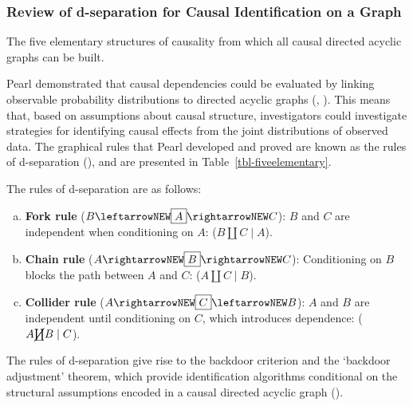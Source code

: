 \documentclass[
  single column]{article}
\begin{document}
\subsubsection{Review of d-separation for Causal Identification on a
Graph}\label{review-of-d-separation-for-causal-identification-on-a-graph}

\begin{table}

\caption{\label{tbl-fiveelementary}The five elementary structures of
causality from which all causal directed acyclic graphs can be built.}

\centering{

\terminologydirectedgraph

}

\end{table}%

Pearl demonstrated that causal dependencies could be evaluated by
linking observable probability distributions to directed acyclic graphs
(, ).
This means that, based on assumptions about causal structure,
investigators could investigate strategies for identifying causal
effects from the joint distributions of observed data. The graphical
rules that Pearl developed and proved are known as the rules of
d-separation (), and are presented
in Table~\ref{tbl-fiveelementary}.

The rules of d-separation are as follows:

\begin{enumerate}[a)]
     \item {\bf Fork rule} ($B \leftarrowNEW \boxed{A} \rightarrowNEW C$): $B$ and $C$ are independent when conditioning on $A$: ($B \coprod C \mid A$).
     \item {\bf Chain rule} ($A \rightarrowNEW \boxed{B} \rightarrowNEW C$): Conditioning on $B$ blocks the path between $A$ and $C$: ($A \coprod C \mid B$).
     \item {\bf Collider rule} ($A \rightarrowNEW \boxed{C} \leftarrowNEW B$): $A$ and $B$ are independent until conditioning on $C$, which introduces dependence: ($A \cancel{\coprod} B \mid C$). 
\end{enumerate}

The rules of d-separation give rise to the backdoor criterion and the
`backdoor adjustment' theorem, which provide identification algorithms
conditional on the structural assumptions encoded in a causal directed
acyclic graph ().
\end{document}
